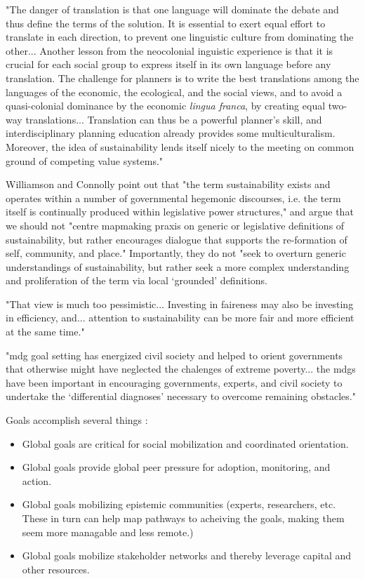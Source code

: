"The danger of translation is that one language will dominate the debate and thus define the terms of the solution. It is essential to exert equal effort to translate in each direction, to prevent one linguistic culture from dominating the other... Another lesson from the neocolonial inguistic experience is that it is crucial for each social group to express itself in its own language before any translation. The challenge for planners is to write the best translations among the languages of the economic, the ecological, and the social views, and to avoid a quasi-colonial dominance by the economic \textit{lingua franca}, by creating equal two-way translations... Translation can thus be a powerful planner's skill, and interdisciplinary planning education already provides some multiculturalism. Moreover, the idea of sustainability lends itself nicely to the meeting on common ground of competing value systems." \cite{campbellGreenCitiesGrowing2016}

Williamson and Connolly point out that "the term sustainability exists and operates within a number of governmental hegemonic discourses, i.e. the term itself is continually produced within legislative power structures," and argue that we should not "centre mapmaking praxis on generic or legislative definitions of sustainability, but rather encourages dialogue that supports the re-formation of self, community, and place." Importantly, they do not "seek to overturn generic understandings of sustainability, but rather seek a more complex understanding and proliferation of the term via local `grounded' definitions. \cite{williamsonTheirworkDevelopmentSustainable2011} 


"That view is much too pessimistic... Investing in faireness may also be investing in efficiency, and... attention to sustainability can be more fair and more efficient at the same time." \cite{sachsAgeSustainableDevelopment2015}

"\ac{mdg} goal setting has energized civil society and helped to orient governments that otherwise might have neglected the chalenges of extreme poverty... the \acp{mdg} have been important in encouraging governments, experts, and civil society to undertake the `differential diagnoses' necessary to overcome remaining obstacles." \cite{sachsAgeSustainableDevelopment2015}

Goals accomplish several things \cite{sachsAgeSustainableDevelopment2015}:

\begin{itemize}
    \setlength{\itemsep}{0pt}%
    \setlength{\parskip}{0pt}%
	\item{Global goals are critical for social mobilization and coordinated orientation.}
	\item{Global goals provide global peer pressure for adoption, monitoring, and action.}
	\item{Global goals mobilizing epistemic communities (experts, researchers, etc. These in turn can help map pathways to acheiving the goals, making them seem more managable and less remote.)}
	\item{Global goals mobilize stakeholder networks and thereby leverage capital and other resources.}
\end{itemize}

